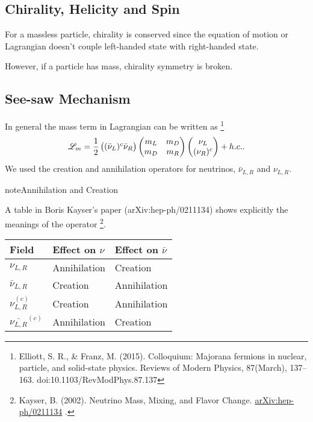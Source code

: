 \documentclass[letterpaper,12pt,english]{sphinxmanual}
\begin{document}
\subsection{Chirality, Helicity and Spin}
\label{mass:chirality-helicity-and-spin}
For a massless particle, chirality is conserved since the equation of motion or Lagrangian doesn't couple left-handed state with right-handed state.

However, if a particle has mass, chirality symmetry is broken.


\subsection{See-saw Mechanism}
\label{mass:see-saw-mechanism}
In general the mass term in Lagrangian can be written as \footnote[1]{
Elliott, S. R., \& Franz, M. (2015). Colloquium: Majorana fermions in nuclear, particle, and solid-state physics. Reviews of Modern Physics, 87(March), 137–163. doi:10.1103/RevModPhys.87.137
}
\begin{gather}
\begin{split}\mathscr{L}_m = \frac{1}{2} \begin{pmatrix} (\bar\nu_L)^c \bar\nu_R \end{pmatrix}\begin{pmatrix} m_L & m_D \\ m_D & m_R  \end{pmatrix} \begin{pmatrix}  \nu_L \\ (\nu_R)^c \end{pmatrix} + h.c. .\end{split}\notag
\end{gather}
We used the creation and annihilation operators for neutrinos, \(\bar\nu_{L,R}\) and \(\nu_{L,R}\).

\begin{notice}{note}{Annihilation and Creation}

A table in Boris Kayser's paper (arXiv:hep-ph/0211134) shows explicitly the meanings of the operator \footnote[2]{
Kayser, B. (2002). Neutrino Mass, Mixing, and Flavor Change. \href{http://arxiv.org/abs/hep-ph/0211134}{arXiv:hep-ph/0211134} .
}.

\begin{tabulary}{\linewidth}{|L|L|L|}
\hline

Field
 & 
Effect on \(\nu\)
 & 
Effect on \(\bar\nu\)
\\
\hline
\(\nu_{L,R}\)
 & 
Annihilation
 & 
Creation
\\
\hline
\(\bar\nu_{L,R}\)
 & 
Creation
 & 
Annihilation
\\
\hline
\(\nu_{L,R}^{(c)}\)
 & 
Creation
 & 
Annihilation
\\
\hline
\(\bar{\nu_{L,R}}^{(c)}\)
 & 
Annihilation
 & 
Creation
\\
\hline\end{tabulary}

\end{notice}
\end{document}
